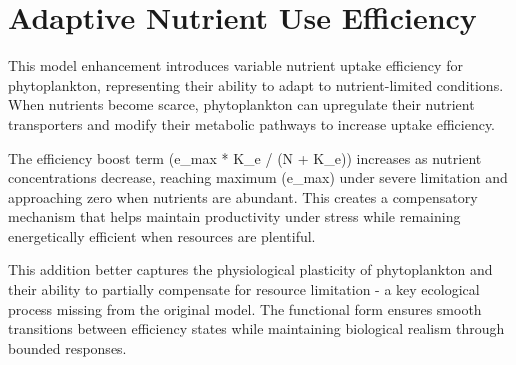 \section{Adaptive Nutrient Use Efficiency}

This model enhancement introduces variable nutrient uptake efficiency for phytoplankton, representing their ability to adapt to nutrient-limited conditions. When nutrients become scarce, phytoplankton can upregulate their nutrient transporters and modify their metabolic pathways to increase uptake efficiency.

The efficiency boost term (e_max * K_e / (N + K_e)) increases as nutrient concentrations decrease, reaching maximum (e_max) under severe limitation and approaching zero when nutrients are abundant. This creates a compensatory mechanism that helps maintain productivity under stress while remaining energetically efficient when resources are plentiful.

This addition better captures the physiological plasticity of phytoplankton and their ability to partially compensate for resource limitation - a key ecological process missing from the original model. The functional form ensures smooth transitions between efficiency states while maintaining biological realism through bounded responses.
